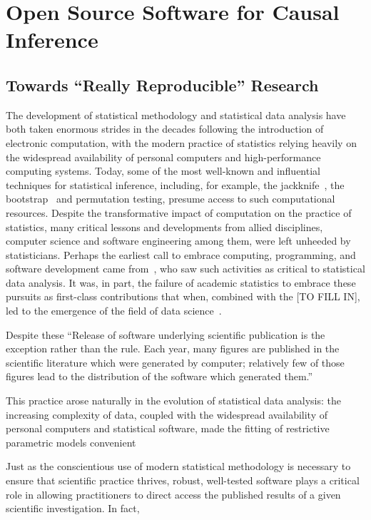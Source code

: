 \chapter{Open Source Software for Causal Inference}\label{five}

\section{Towards ``Really Reproducible'' Research}

The development of statistical methodology and statistical data analysis have
both taken enormous strides in the decades following the introduction of
electronic computation, with the modern practice of statistics relying heavily
on the widespread availability of personal computers and high-performance
computing systems. Today, some of the most well-known and influential techniques
for statistical inference, including, for example, the
jackknife~\citep{efron1981nonparametric}, the
bootstrap~\citep{efron1981nonparametric, efron1994introduction,
davison1997bootstrap} and permutation testing, presume access to such
computational resources. Despite the transformative impact of computation on the
practice of statistics, many critical lessons and developments from allied
disciplines, computer science and software engineering among them, were left
unheeded by statisticians. Perhaps the earliest call to embrace computing,
programming, and software development came from~\citet{tukey1962future}, who saw
such activities as critical to statistical data analysis. It was, in part, the
failure of academic statistics to embrace these pursuits as first-class
contributions that when, combined with the [TO FILL IN], led to the emergence of
the field of data science~\citep{donoho2017fifty}.

Despite these
``Release of software underlying scientific publication is the exception
rather than the rule. Each year, many figures are published in the scientific
literature which were generated by computer; relatively few of those figures
lead to the distribution of the software which generated them.''

This practice arose naturally in the evolution of statistical data analysis: the
increasing complexity of data, coupled with the widespread availability of
personal computers and statistical software, made the fitting of restrictive
parametric models convenient

Just as the conscientious use of modern statistical methodology is necessary to
ensure that scientific practice thrives, robust, well-tested software plays
a critical role in allowing practitioners to direct access the published results
of a given scientific investigation. In fact,

